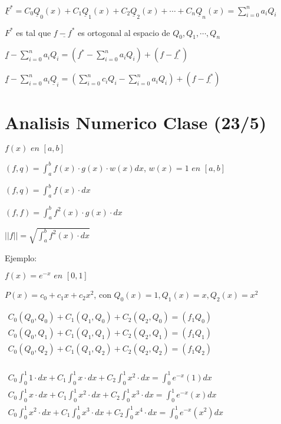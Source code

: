 \documentclass[12pt]{article}
\begin{document}
$\displaystyle \underline F^* = C_0 \underline Q_0(x)+ C_1 \underline Q_1(x)+ C_2 \underline Q_2(x)+\cdots+ C_n \underline Q_n(x)=\sum_{i=0}^{n}{a_iQ_i}$

$\displaystyle F^*$ es tal que $\displaystyle \underline {f-f^*}$ es ortogonal al espacio de $\displaystyle Q_0, Q_1,\cdots,Q_n$

$\displaystyle \underline{f}- \sum_{i=0}^{n}{a_iQ_i}=(f^*-\sum_{i=0}^{n}{a_iQ_i})+(f- \underline{f^*})$

$\displaystyle \underline{f}- \sum_{i=0}^{n}{a_i \underline Q_i}=(\sum_{i=0}^{n}{c_iQ_i}-\sum_{i=0}^{n}{a_iQ_i})+(f- \underline{f^*})$

\newpage

\section*{Analisis Numerico Clase (23/5)}

$\displaystyle f(x)\textit{  en  } [a,b]$

$\displaystyle (f,q)=\int_{a}^{b}{f(x)\cdot g(x)\cdot w(x) dx}$, \hspace{1cm}$\displaystyle w(x)=1\textit{  en  } [a,b]$

$\displaystyle (f,q)=\int_{a}^{b}{f(x)\cdot dx}$

$\displaystyle (f,f)=\int_{a}^{b}{f^2(x)\cdot g(x)\cdot dx}$

$\displaystyle ||f||=\sqrt{\int_{a}^{b}{f^2(x)\cdot dx}}$

Ejemplo: 

$\displaystyle f(x)=e^{-x}\textit{  en  } [0,1]$

$\displaystyle P(x)=c_0+c_1x+c_2x^2$, con $\displaystyle Q_0(x)=1,Q_1(x)=x, Q_2(x)=x^2$


$\displaystyle \begin{array}{c}
C_0(Q_0,Q_0)+C_1(Q_1,Q_0)+C_2(Q_2,Q_0) = (f_1Q_0)\\
C_0(Q_0,Q_1)+C_1(Q_1,Q_1)+C_2(Q_2,Q_1) = (f_1Q_1)\\
C_0(Q_0,Q_2)+C_1(Q_1,Q_2)+C_2(Q_2,Q_2) = (f_1Q_2)\\
\end{array}$


$\displaystyle \begin{array}{c}
C_0\int_{0}^{1}{1\cdot dx}+C_1\int_{0}^{1}{x\cdot dx}+C_2\int_{0}^{1}{x^2\cdot dx} = \int_{0}^{1}{e^{-x}(1)dx}\\
C_0\int_{0}^{1}{x\cdot dx}+C_1\int_{0}^{1}{x^2\cdot dx}+C_2\int_{0}^{1}{x^3 \cdot dx} = \int_{0}^{1}{e^{-x}(x)dx}\\
C_0\int_{0}^{1}{x^2\cdot dx}+C_1\int_{0}^{1}{x^3\cdot dx}+C_2\int_{0}^{1}{x^4\cdot dx} = \int_{0}^{1}{e^{-x}(x^2)dx}\\
\end{array}$
\end{document}
